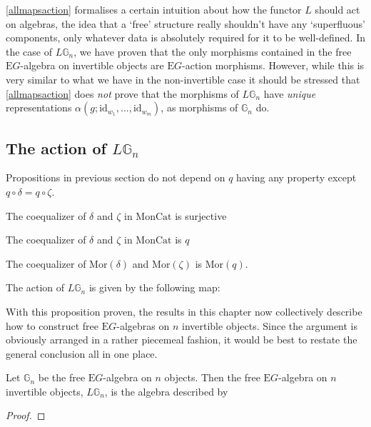 \cref{allmapsaction} formalises a certain intuition about how the functor $L$ should act on algebras, the idea that a `free' structure really shouldn't have any `superfluous' components, only whatever data is absolutely required for it to be well-defined. In the case of $L\mathbb{G}_n$, we have proven that the only morphisms contained in the free $\mathrm{E}G$-algebra on invertible objects are $\mathrm{E}G$-action morphisms. However, while this is very similar to what we have in the non-invertible case it should be stressed that \cref{allmapsaction} does \emph{not} prove that the morphisms of $L\mathbb{G}_n$ have \emph{unique} representations $\alpha(g; \mathrm{id}_{w_1}, ..., \mathrm{id}_{w_m})$, as morphisms of $\mathbb{G}_n$ do.

\subsection{The action of $L\mathbb{G}_n$}

\begin{prop} Propositions in previous section do not depend on $q$ having any property except $q \circ \delta = q \circ \zeta$.
\end{prop}

\begin{prop} The coequalizer of $\delta$ and $\zeta$ in $\mathrm{MonCat}$ is surjective
\end{prop}

\begin{prop} The coequalizer of $\delta$ and $\zeta$ in $\mathrm{MonCat}$ is $q$
\end{prop}

\begin{cor} The coequalizer of $\mathrm{Mor}(\delta)$ and $\mathrm{Mor}(\zeta)$ is $\mathrm{Mor}(q)$.
\end{cor}

\begin{prop} The action of $L\mathbb{G}_n$ is given by the following map:
\end{prop}

With this proposition proven, the results in this chapter now collectively describe how to construct free $\mathrm{E}G$-algebras on $n$ invertible objects. Since the argument is obviously arranged in a rather piecemeal fashion, it would be best to restate the general conclusion all in one place.

\begin{thm}\label{freeinvalg} Let $\mathbb{G}_n$ be the free $\mathrm{E}G$-algebra on $n$ objects. Then the free $\mathrm{E}G$-algebra on $n$ invertible objects, $L\mathbb{G}_n$, is the algebra described by
\end{thm}
\begin{proof}
\end{proof}

